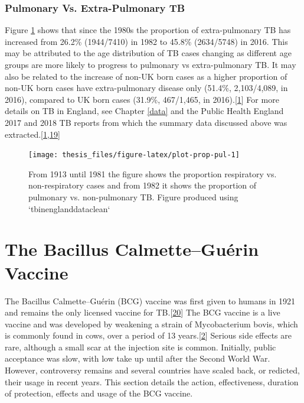 \documentclass[11pt,twoside]{bristolthesis}
\begin{document}
  \hypertarget{pulmonary-vs.-extra-pulmonary-tb}{%
  \subsubsection{Pulmonary Vs. Extra-Pulmonary TB}\label{pulmonary-vs.-extra-pulmonary-tb}}
  
  Figure \ref{fig:plot-prop-pul} shows that since the 1980s the proportion of extra-pulmonary TB has increased from 26.2\% (1944/7410) in 1982 to 45.8\% (2634/5748) in 2016. This may be attributed to the age distribution of TB cases changing as different age groups are more likely to progress to pulmonary vs extra-pulmonary TB. It may also be related to the increase of non-UK born cases as a higher proportion of non-UK born cases have extra-pulmonary disease only (51.4\%, 2,103/4,089, in 2016), compared to UK born cases (31.9\%, 467/1,465, in 2016).{[}\protect\hyperlink{ref-PHE2017}{1}{]} For more details on TB in England, see Chapter \ref{data} and the Public Health England 2017 and 2018 TB reports from which the summary data discussed above was extracted.{[}\protect\hyperlink{ref-PHE2017}{1},\protect\hyperlink{ref-PHE2018}{19}{]}
  \begin{figure}
  
  {\centering \texttt{[image: thesis\_files/figure-latex/plot-prop-pul-1]} 
  
  }
  
  \caption[From 1913 until 1981 the figure shows the proportion respiratory vs. non-respiratory cases and from 1982 it shows the proportion of pulmonary vs. non-pulmonary TB.]{From 1913 until 1981 the figure shows the proportion respiratory vs. non-respiratory cases and from 1982 it shows the proportion of pulmonary vs. non-pulmonary TB. Figure produced using `tbinenglanddataclean`}\label{fig:plot-prop-pul}
  \end{figure}
  \hypertarget{the-bacillus-calmetteguerin-vaccine}{%
  \section{The Bacillus Calmette--Guérin Vaccine}\label{the-bacillus-calmetteguerin-vaccine}}
  
  The Bacillus Calmette--Guérin (BCG) vaccine was first given to humans in 1921 and remains the only licensed vaccine for TB.{[}\protect\hyperlink{ref-Medicine2013}{20}{]} The BCG vaccine is a live vaccine and was developed by weakening a strain of Mycobacterium bovis, which is commonly found in cows, over a period of 13 years.{[}\protect\hyperlink{ref-TheWorldHealthOrganization:2018va}{2}{]} Serious side effects are rare, although a small scar at the injection site is common. Initially, public acceptance was slow, with low take up until after the Second World War. However, controversy remains and several countries have scaled back, or redicted, their usage in recent years. This section details the action, effectiveness, duration of protection, effects and usage of the BCG vaccine.
  
\end{document}
